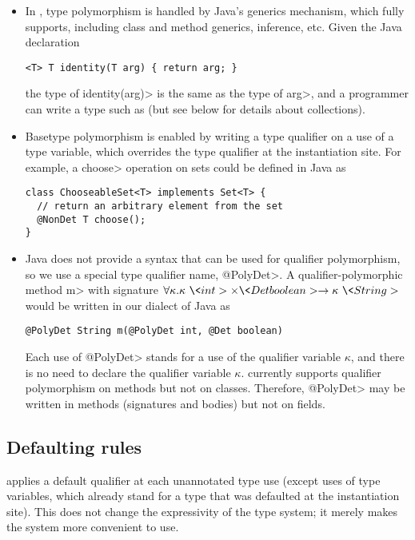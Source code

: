 \begin{itemize}
\item
In \theDeterminismCheckerImplementation,
type polymorphism is handled by Java's generics mechanism, which
\theDeterminismChecker fully supports, including class and method generics,
inference, etc.
Given the Java declaration
\begin{Verbatim}
<T> T identity(T arg) { return arg; }
\end{Verbatim}
the type of \<identity(arg)> is the same as the type of
\<arg>, and a programmer can write a type such as  (but see below for details about collections).
\item
Basetype polymorphism is enabled by writing a type qualifier on a use of a
type variable, which overrides the type qualifier at the instantiation
site.
For example, a \<choose> operation on sets could be defined in Java as
\begin{Verbatim}
class ChooseableSet<T> implements Set<T> {
  // return an arbitrary element from the set
  @NonDet T choose();
}
\end{Verbatim}
\item
Java does not provide a syntax that can be used for qualifier polymorphism,
so we use a special type qualifier name, \<@PolyDet>.
A qualifier-polymorphic method \<m> with signature $\forall \kappa . \kappa\ \<int> \times \<Det boolean> \rightarrow
\kappa\ \<String>$ would be written in our dialect of Java as
\begin{Verbatim}
@PolyDet String m(@PolyDet int, @Det boolean)
\end{Verbatim}
Each use of \<@PolyDet> stands for a use of the qualifier variable
$\kappa$, and there is no need to declare the qualifier variable $\kappa$.
\TheDeterminismChecker currently supports
qualifier
polymorphism on methods but not on classes.
Therefore, \<@PolyDet> may be written in methods (signatures and bodies)
but not on fields.
\end{itemize}


\subsection{Defaulting rules}\label{defaulting}

\TheDeterminismChecker applies a default qualifier at each unannotated type
use (except uses of type variables, which already stand for a type that was
defaulted at the instantiation site).
This does not change the expressivity of the type system; it merely makes
the system more convenient to use.

